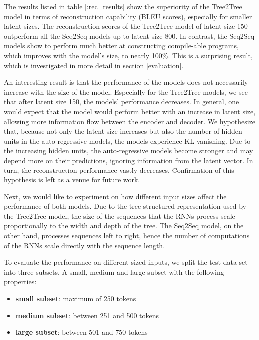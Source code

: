 The results listed in table \ref{:rec_results} show the superiority of the Tree2Tree model in terms of reconstruction capability (BLEU scores), especially for smaller latent sizes. The reconstruction scores of the Tree2Tree model of latent size 150 outperform all the Seq2Seq models up to latent size 800. In contrast, the Seq2Seq models show to perform much better at constructing compile-able programs, which improves with the model's size, to nearly 100\%. This is a surprising result, which is investigated in more detail in section \ref{evaluation}.

 


An interesting result is that the performance of the models does not necessarily increase with the size of the model. Especially for the Tree2Tree models, we see that after latent size 150, the models' performance decreases. In general, one would expect that the model would perform better with an increase in latent size, allowing more information flow between the encoder and decoder. We hypothesize that, because not only the latent size increases but also the number of hidden units in the auto-regressive models, the models experience KL vanishing. Due to the increasing hidden units, the auto-regressive models become stronger and may depend more on their predictions, ignoring information from the latent vector. In turn, the reconstruction performance vastly decreases. Confirmation of this hypothesis is left as a venue for future work.



Next, we would like to experiment on how different input sizes affect the performance of both models. Due to the tree-structured representation used by the Tree2Tree model, the size of the sequences that the RNNs process scale proportionally to the width and depth of the tree. The Seq2Seq model, on the other hand, processes sequences left to right, hence the number of computations of the RNNs scale directly with the sequence length. 



To evaluate the performance on different sized inputs, we split the test data set into three subsets. A small, medium and large subset with the following properties:

\begin{itemize}
    \item \textbf{small subset}: maximum of 250 tokens
    \item \textbf{medium subset}: between 251 and 500 tokens
    \item \textbf{large subset}: between 501 and 750 tokens
\end{itemize}

